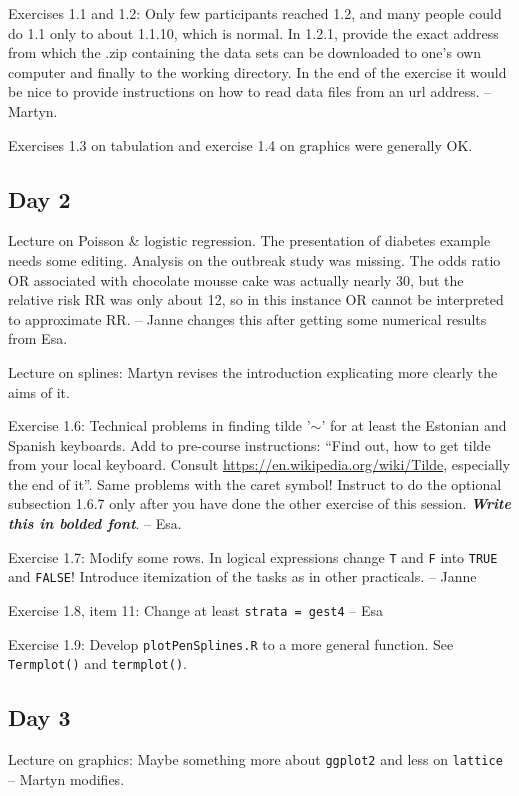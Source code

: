 \documentclass[11pt,a4]{article}
\begin{document}
Exercises 1.1 and 1.2: Only few participants reached 1.2, and many people could do 1.1 only to about 1.1.10, which is normal. 
In 1.2.1, provide the exact address from which the .zip containing the data sets can be downloaded to one's own computer and finally to the working directory.
In the end of the exercise it would be nice to provide instructions on how to read data files from an url address. -- Martyn.

Exercises 1.3 on tabulation and exercise 1.4 on graphics were generally OK. 

\subsection*{Day 2}

Lecture on Poisson \& logistic regression. 
The presentation of diabetes example needs some editing.
Analysis on the outbreak study was missing. 
The odds ratio OR associated with chocolate mousse cake was actually nearly 30, but the relative risk RR was only about 12, so in this instance OR cannot be interpreted to approximate RR.
-- Janne changes this after getting some numerical results from Esa.

Lecture on splines: Martyn revises the introduction explicating more clearly the aims of it.

Exercise 1.6: Technical problems in finding tilde '$\sim$' for at least the Estonian and Spanish keyboards. 
Add to pre-course instructions: ``Find out, how to get tilde from your local keyboard. 
Consult \url{https://en.wikipedia.org/wiki/Tilde}, especially the end of it''.
Same problems with the caret symbol! 
Instruct to do the optional subsection 1.6.7 only after you have done the other 
exercise of this session. \textbf{\textit{Write this in bolded font}}.
-- Esa.

Exercise 1.7: Modify some rows.
In logical expressions change {\tt T} and {\tt F} into {\tt TRUE} and {\tt FALSE}!
Introduce itemization  of the tasks as in other practicals.
 -- Janne


Exercise 1.8, item 11: Change at least {\tt strata = gest4} -- Esa

Exercise 1.9: Develop {\tt plotPenSplines.R} to a more general function.
See {\tt Termplot()} and {\tt termplot()}. 

\subsection*{Day 3}

Lecture on graphics: Maybe something more about {\tt ggplot2} 
and less on {\tt lattice} -- Martyn modifies.
\end{document}
